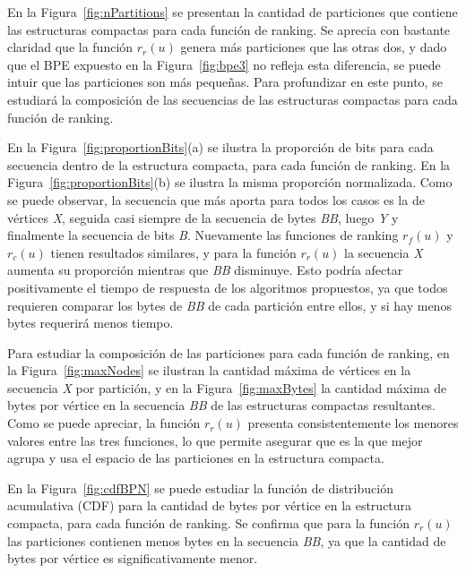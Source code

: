 En la Figura~\ref{fig:nPartitions} se presentan la cantidad de particiones que contiene las estructuras compactas para cada función de ranking. Se aprecia con bastante claridad que la función $r_{r}(u)$ genera más particiones que las otras dos, y dado que el BPE expuesto en la Figura~\ref{fig:bpe3} no refleja esta diferencia, se puede intuir que las particiones son más pequeñas. Para profundizar en este punto, se estudiará la composición de las secuencias de las estructuras compactas para cada función de ranking.



En la Figura~\ref{fig:proportionBits}(a) se ilustra la proporción de bits para cada secuencia dentro de la estructura compacta, para cada función de ranking. En la Figura~\ref{fig:proportionBits}(b) se ilustra la misma proporción normalizada. Como se puede observar, la secuencia que más aporta para todos los casos es la de vértices \textit{X}, seguida casi siempre de la secuencia de bytes \textit{BB}, luego \textit{Y} y finalmente la secuencia de bits \textit{B}. Nuevamente las funciones de ranking $r_{f}(u)$ y $r_{c}(u)$ tienen resultados similares, y para la función $r_{r}(u)$ la secuencia \textit{X} aumenta su proporción mientras que \textit{BB} disminuye. Esto podría afectar positivamente el tiempo de respuesta de los algoritmos propuestos, ya que todos requieren comparar los bytes de \textit{BB} de cada partición entre ellos, y si hay menos bytes requerirá menos tiempo.



Para estudiar la composición de las particiones para cada función de ranking, en la Figura~\ref{fig:maxNodes} se ilustran la cantidad máxima de vértices en la secuencia \textit{X} por partición, y en la Figura~\ref{fig:maxBytes} la cantidad máxima de bytes por vértice en la secuencia \textit{BB} de las estructuras compactas resultantes. Como se puede apreciar, la función $r_{r}(u)$ presenta consistentemente los menores valores entre las tres funciones, lo que permite asegurar que es la que mejor agrupa y usa el espacio de las particiones en la estructura compacta.




En la Figura~\ref{fig:cdfBPN} se puede estudiar la función de distribución acumulativa (CDF) para la cantidad de bytes por vértice en la estructura compacta, para cada función de ranking. Se confirma que para la función $r_{r}(u)$ las particiones contienen menos bytes en la secuencia \textit{BB}, ya que la cantidad de bytes por vértice es significativamente menor.

